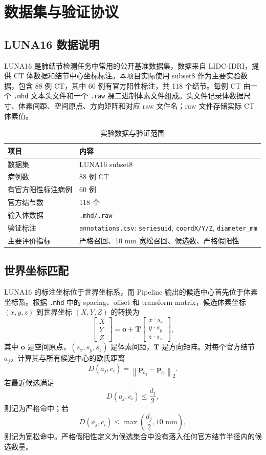 \documentclass[UTF8,zihao=-4,fontset=none]{ctexart}
\newcommand{\code}[1]{\texttt{#1}}
\begin{document}
\section{数据集与验证协议}

\subsection{LUNA16 数据说明}

LUNA16 是肺结节检测任务中常用的公开基准数据集，数据来自 LIDC-IDRI，提供 CT 体数据和结节中心坐标标注。本项目实际使用 subset8 作为主要实验数据，包含 88 例 CT，其中 60 例有官方阳性标注，共 118 个结节。每例 CT 由一个 \code{.mhd} 文本头文件和一个 \code{.raw} 裸二进制体素文件组成。头文件记录体数据尺寸、体素间距、空间原点、方向矩阵和对应 raw 文件名；raw 文件存储实际 CT 体素值。

\begin{table}[H]
\centering
\caption{实验数据与验证范围}
\begin{tabular}{ll}
\toprule
项目 & 内容 \\
\midrule
数据集 & LUNA16 subset8 \\
病例数 & 88 例 CT \\
有官方阳性标注病例 & 60 例 \\
官方结节数 & 118 个 \\
输入体数据 & \code{.mhd/.raw} \\
验证标注 & \code{annotations.csv}: \code{seriesuid}, \code{coordX/Y/Z}, \code{diameter\_mm} \\
主要评价指标 & 严格召回、10 mm 宽松召回、候选数、严格假阳性 \\
\bottomrule
\end{tabular}
\end{table}

\subsection{世界坐标匹配}

LUNA16 的标注坐标位于世界坐标系，而 Pipeline 输出的候选中心首先位于体素坐标系。根据 \code{.mhd} 中的 spacing、offset 和 transform matrix，候选体素坐标 \((x,y,z)\) 到世界坐标 \((X,Y,Z)\) 的转换为
\[
\begin{bmatrix}X\\Y\\Z\end{bmatrix}
=
\mathbf{o}
+
\mathbf{T}
\begin{bmatrix}
x\cdot s_x\\
y\cdot s_y\\
z\cdot s_z
\end{bmatrix},
\]
其中 \(\mathbf{o}\) 是空间原点，\((s_x,s_y,s_z)\) 是体素间距，\(\mathbf{T}\) 是方向矩阵。对每个官方结节 \(a_j\)，计算其与所有候选中心的欧氏距离
\[
D(a_j,c_i)=\left\|\mathbf{p}_{a_j}-\mathbf{p}_{c_i}\right\|_2.
\]
若最近候选满足
\[
D(a_j,c_i)\leq \frac{d_j}{2},
\]
则记为严格命中；若
\[
D(a_j,c_i)\leq \max\left(\frac{d_j}{2},10\text{ mm}\right),
\]
则记为宽松命中。严格假阳性定义为候选集合中没有落入任何官方结节半径内的候选数量。
\end{document}
